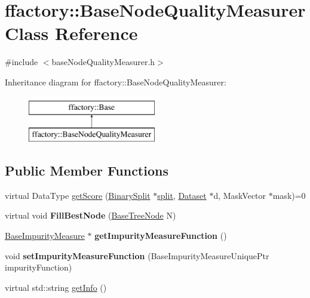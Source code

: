 \hypertarget{classffactory_1_1_base_node_quality_measurer}{\section{ffactory\-:\-:Base\-Node\-Quality\-Measurer Class Reference}
\label{classffactory_1_1_base_node_quality_measurer}
}


{\ttfamily \#include $<$base\-Node\-Quality\-Measurer.\-h$>$}

Inheritance diagram for ffactory\-:\-:Base\-Node\-Quality\-Measurer\-:\begin{figure}[H]
\begin{center}
\leavevmode
\includegraphics[height=2.000000cm]{classffactory_1_1_base_node_quality_measurer}
\end{center}
\end{figure}
\subsection*{Public Member Functions}
\begin{DoxyCompactItemize}
\item 
virtual Data\-Type \hyperlink{classffactory_1_1_base_node_quality_measurer_a2451bb93502b2350ba20e17f928ab313}{get\-Score} (\hyperlink{classffactory_1_1_binary_split}{Binary\-Split} $\ast$\hyperlink{namespaceffactory_a1fec00d28dbea621e480fd9f221d972e}{split}, \hyperlink{classffactory_1_1_dataset}{Dataset} $\ast$d, Mask\-Vector $\ast$mask)=0
\item 
\hypertarget{classffactory_1_1_base_node_quality_measurer_a4da2a8c3bf717d62cb1263922585522a}{virtual void {\bfseries Fill\-Best\-Node} (\hyperlink{classffactory_1_1_base_tree_node}{Base\-Tree\-Node} N)}\label{classffactory_1_1_base_node_quality_measurer_a4da2a8c3bf717d62cb1263922585522a}

\item 
\hypertarget{classffactory_1_1_base_node_quality_measurer_a34d90b57839b4f4187d16b88db6f9b87}{\hyperlink{classffactory_1_1_base_impurity_measure}{Base\-Impurity\-Measure} $\ast$ {\bfseries get\-Impurity\-Measure\-Function} ()}\label{classffactory_1_1_base_node_quality_measurer_a34d90b57839b4f4187d16b88db6f9b87}

\item 
\hypertarget{classffactory_1_1_base_node_quality_measurer_a34306d184defa83f0608a3cd5a5c6e32}{void {\bfseries set\-Impurity\-Measure\-Function} (Base\-Impurity\-Measure\-Unique\-Ptr impurity\-Function)}\label{classffactory_1_1_base_node_quality_measurer_a34306d184defa83f0608a3cd5a5c6e32}

\item 
virtual std\-::string \hyperlink{classffactory_1_1_base_node_quality_measurer_a7d93ff368d8b2b439c0f7310213bf63f}{get\-Info} ()
\end{DoxyCompactItemize}



